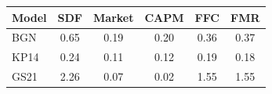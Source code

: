 \begin{tabular}{l c c c c c}
\toprule
Model & SDF & Market & CAPM & FFC & FMR \\
\midrule
BGN & 0.65 & 0.19 & 0.20 & 0.36 & 0.37 \\
KP14 & 0.24 & 0.11 & 0.12 & 0.19 & 0.18 \\
GS21 & 2.26 & 0.07 & 0.02 & 1.55 & 1.55 \\
\bottomrule
\end{tabular}